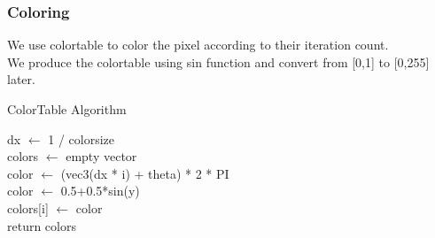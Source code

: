\documentclass{article}
\begin{document}
        \subsubsection{Coloring}
            We use colortable to color the pixel according to their iteration count.\\
            We produce the colortable using sin function and convert from [0,1] to [0,255] later.
            \begin{algorithm}[]
            	\caption{ColorTable Algorithm}
            	\LinesNumbered %
                dx $\leftarrow$ 1 / colorsize\\
            	colors $\leftarrow$ empty vector\\
                {
                    color $\leftarrow$ (vec3(dx * i) + theta) * 2 * PI\\
                    color $\leftarrow$ 0.5+0.5*sin(y)\\
                    colors[i] $\leftarrow$ color\\
                }
                return colors
            \end{algorithm}
\end{document}
